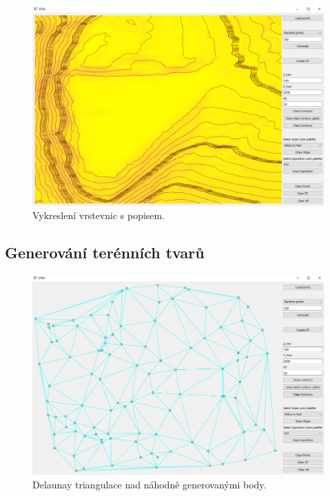 \documentclass[a4paper, 12pt, oneside, titlepage]{article} %
\begin{document}
\begin{figure}[!htb]
	\centering
	\includegraphics[scale=0.45]{obrazky/vrst_pop.png} 
	\caption{Vykreslení vrstevnic s popisem.
	}
	\label{fig:vrst_pop}
\end{figure} 
\FloatBarrier


\subsection{Generování terénních tvarů}
\begin{figure}[!htb]
	\centering
	\includegraphics[scale=0.45]{obrazky/rand_dt.png} 
	\caption{Delaunay triangulace nad náhodně generovanými body.
	}
	\label{fig:rand_dt}
\end{figure} 
\FloatBarrier
\end{document}
